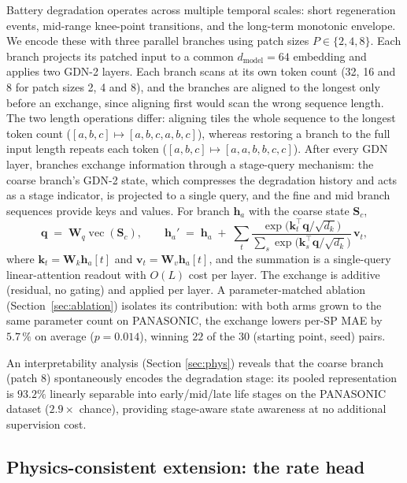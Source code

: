 Battery degradation operates across multiple temporal scales: short
regeneration events, mid-range knee-point transitions, and the
long-term monotonic envelope. We encode these with three parallel
branches using patch sizes $P \in \{2,4,8\}$. Each branch projects its
patched input to a common $d_{\text{model}}=64$ embedding and applies
two GDN-2 layers. Each branch scans at its own token count (32, 16 and
8 for patch sizes 2, 4 and 8), and the branches are aligned to the
longest only before an exchange, since aligning first would scan the
wrong sequence length. The two length operations differ: aligning tiles
the whole sequence to the longest token count
($[a,b,c]\mapsto[a,b,c,a,b,c]$), whereas restoring a branch to the full
input length repeats each token ($[a,b,c]\mapsto[a,a,b,b,c,c]$).
After every GDN layer, branches exchange
information through a stage-query mechanism: the coarse branch's
GDN-2 state, which compresses the degradation history and acts as a
stage indicator, is projected to a single query, and the fine and
mid branch sequences provide keys and values. For branch
$\mathbf{h}_a$ with the coarse state $\mathbf{S}_c$,
\begin{equation}
\label{eq:stagequery}
\mathbf{q} \;=\; \mathbf{W}_q \operatorname{vec}(\mathbf{S}_c),
\qquad
\mathbf{h}_a' \;=\; \mathbf{h}_a \;+\;
\sum_{t} \frac{\exp\!\big(\mathbf{k}_t^{\top}\mathbf{q}/\sqrt{d_k}\big)}
{\sum_{s} \exp\!\big(\mathbf{k}_s^{\top}\mathbf{q}/\sqrt{d_k}\big)}
\,\mathbf{v}_t,
\end{equation}
where $\mathbf{k}_t = \mathbf{W}_k \mathbf{h}_a[t]$ and
$\mathbf{v}_t = \mathbf{W}_v \mathbf{h}_a[t]$, and the summation is a
single-query linear-attention readout with $O(L)$ cost per layer.
The exchange is additive (residual, no gating) and applied
per layer. A parameter-matched ablation
(Section~\ref{sec:ablation}) isolates its contribution: with both arms
grown to the same parameter count on PANASONIC, the exchange lowers
per-SP MAE by $5.7\,\%$ on average ($p=0.014$), winning $22$ of the $30$
(starting point, seed) pairs.

An interpretability analysis (Section \ref{sec:phys}) reveals that
the coarse branch (patch 8) spontaneously encodes the degradation
stage: its pooled representation is $93.2\%$ linearly separable into
early/mid/late life stages on the PANASONIC dataset ($2.9\times$
chance), providing stage-aware state awareness at no additional
supervision cost.

\subsection{Physics-consistent extension: the rate head}
\label{sec:physics}

